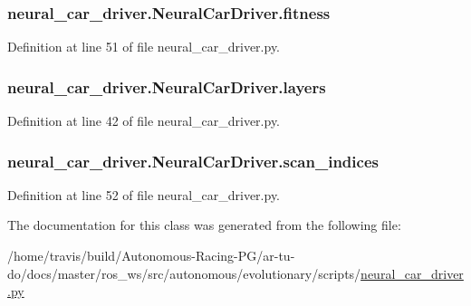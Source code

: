 \subsubsection[{\texorpdfstring{fitness}{fitness}}]{\setlength{\rightskip}{0pt plus 5cm}neural\+\_\+car\+\_\+driver.\+Neural\+Car\+Driver.\+fitness}\hypertarget{classneural__car__driver_1_1_neural_car_driver_a4d709e4419449add88e2a1a5d825e918}{}\label{classneural__car__driver_1_1_neural_car_driver_a4d709e4419449add88e2a1a5d825e918}


Definition at line 51 of file neural\+\_\+car\+\_\+driver.\+py.

\subsubsection[{\texorpdfstring{layers}{layers}}]{\setlength{\rightskip}{0pt plus 5cm}neural\+\_\+car\+\_\+driver.\+Neural\+Car\+Driver.\+layers}\hypertarget{classneural__car__driver_1_1_neural_car_driver_a425f558140c554a734fad61b9eb83940}{}\label{classneural__car__driver_1_1_neural_car_driver_a425f558140c554a734fad61b9eb83940}


Definition at line 42 of file neural\+\_\+car\+\_\+driver.\+py.

\subsubsection[{\texorpdfstring{scan\+\_\+indices}{scan_indices}}]{\setlength{\rightskip}{0pt plus 5cm}neural\+\_\+car\+\_\+driver.\+Neural\+Car\+Driver.\+scan\+\_\+indices}\hypertarget{classneural__car__driver_1_1_neural_car_driver_ac7a4e813a3f642cdb4c88a3c7bcc0ac7}{}\label{classneural__car__driver_1_1_neural_car_driver_ac7a4e813a3f642cdb4c88a3c7bcc0ac7}


Definition at line 52 of file neural\+\_\+car\+\_\+driver.\+py.



The documentation for this class was generated from the following file\+:\begin{DoxyCompactItemize}
\item 
/home/travis/build/\+Autonomous-\/\+Racing-\/\+P\+G/ar-\/tu-\/do/docs/master/ros\+\_\+ws/src/autonomous/evolutionary/scripts/\hyperlink{neural__car__driver_8py}{neural\+\_\+car\+\_\+driver.\+py}\end{DoxyCompactItemize}
